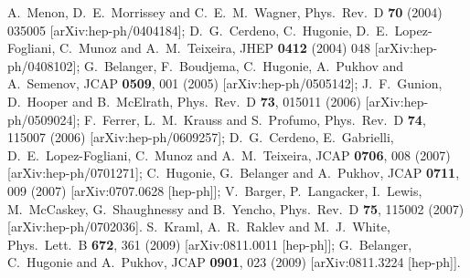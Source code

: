 \documentclass[aps,12pt,superscriptaddress,nofootinbib,floatfix,showpacs]{revtex4}
\begin{document}
\begin{thebibliography}{99}
A.~Menon, D.~E.~Morrissey and C.~E.~M.~Wagner,
  Phys.\ Rev.\  D {\bf 70} (2004) 035005
  [arXiv:hep-ph/0404184];
  D.~G.~Cerdeno, C.~Hugonie, D.~E.~Lopez-Fogliani, C.~Munoz and A.~M.~Teixeira,
  JHEP {\bf 0412} (2004) 048
  [arXiv:hep-ph/0408102];
  G.~Belanger, F.~Boudjema, C.~Hugonie, A.~Pukhov and A.~Semenov,
  JCAP {\bf 0509}, 001 (2005)
  [arXiv:hep-ph/0505142];
  J.~F.~Gunion, D.~Hooper and B.~McElrath,
  Phys.\ Rev.\  D {\bf 73}, 015011 (2006)
  [arXiv:hep-ph/0509024];
  F.~Ferrer, L.~M.~Krauss and S.~Profumo,
  Phys.\ Rev.\  D {\bf 74}, 115007 (2006)
  [arXiv:hep-ph/0609257];
   D.~G.~Cerdeno, E.~Gabrielli, D.~E.~Lopez-Fogliani, C.~Munoz and A.~M.~Teixeira,
  JCAP {\bf 0706}, 008 (2007)
  [arXiv:hep-ph/0701271];
  C.~Hugonie, G.~Belanger and A.~Pukhov,
  JCAP {\bf 0711}, 009 (2007)
  [arXiv:0707.0628 [hep-ph]];
  V.~Barger, P.~Langacker, I.~Lewis, M.~McCaskey, G.~Shaughnessy and B.~Yencho,
  Phys.\ Rev.\  D {\bf 75}, 115002 (2007)
  [arXiv:hep-ph/0702036].
  S.~Kraml, A.~R.~Raklev and M.~J.~White,
  Phys.\ Lett.\  B {\bf 672}, 361 (2009)
  [arXiv:0811.0011 [hep-ph]];
  G.~Belanger, C.~Hugonie and A.~Pukhov,
  JCAP {\bf 0901}, 023 (2009)
  [arXiv:0811.3224 [hep-ph]].
  



\end{thebibliography}
\end{document}
